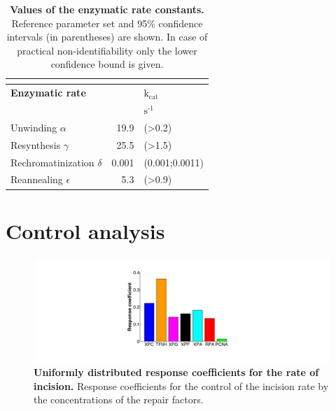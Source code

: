 \begin{table}[H]
	
\begin{center}
	\begin{tabular}{lrl}
		
		\multicolumn{3}{l}{} \\
		\hline
		\textbf{Enzymatic rate}    && \textbf{$\text{k}_{\text{cat}}$}  \\
		\hline
		&  &$\text{s}^{\text{-1}}$       \\
		Unwinding  $\alpha$                                     & 19.9& (>0.2)                 \\
		Resynthesis $\gamma$                                 & 25.5 &(>1.5)     \\
		Rechromatinization $\delta$                         & 0.001 &(0.001;0.0011)                   \\
		Reannealing  $\epsilon$                                & 5.3&(>0.9)    \\
		\hline
	\end{tabular}
	\caption{\textbf{Values of the enzymatic rate constants.}  Reference parameter set and 95\% confidence intervals (in parentheses) are shown. In case of practical non-identifiability only the lower confidence bound is given.}
	\label{tab:parameter_catalyticRates}
	\end{center}
\end{table}

\section{Control analysis}

\begin{figure}[h!]
	\begin{center}
		\includegraphics[width=1\textwidth]{Abbildungen/figure_A_4.pdf}
		\caption{\textbf{Uniformly distributed response coefficients for the rate of incision.} Response coefficients for the control of the incision rate by the concentrations of the repair factors. }
		\label{fig:cc_rateOfincision}
	\end{center}
\end{figure}

